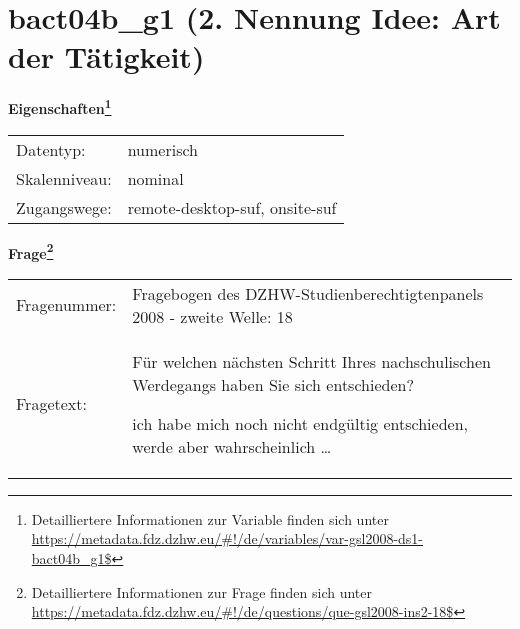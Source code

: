 
    \setcounter{footnote}{0}

    \vspace*{-1.8cm}
	\section{bact04b\_g1 (2. Nennung Idee: Art der Tätigkeit)}
	\label{section:bact04b_g1}



    \vspace*{0.5cm}
    \noindent\textbf{Eigenschaften\footnote{Detailliertere Informationen zur Variable finden sich unter
		\url{https://metadata.fdz.dzhw.eu/\#!/de/variables/var-gsl2008-ds1-bact04b_g1$}}}\\
	\begin{tabularx}{\hsize}{@{}lX}
	Datentyp: & numerisch \\
	Skalenniveau: & nominal \\
	Zugangswege: &
	  remote-desktop-suf, 
	  onsite-suf
 \\
    \end{tabularx}



				\vspace*{0.5cm}
                \noindent\textbf{Frage\footnote{Detailliertere Informationen zur Frage finden sich unter
		              \url{https://metadata.fdz.dzhw.eu/\#!/de/questions/que-gsl2008-ins2-18$}}}\\
				\begin{tabularx}{\hsize}{@{}lX}
					Fragenummer: &
					  Fragebogen des DZHW-Studienberechtigtenpanels 2008 - zweite Welle:
					  18
 \\
					Fragetext: & Für welchen nächsten Schritt Ihres nachschulischen Werdegangs haben Sie sich entschieden?\par  ich habe mich noch nicht endgültig entschieden, werde aber wahrscheinlich … \\
				\end{tabularx}





